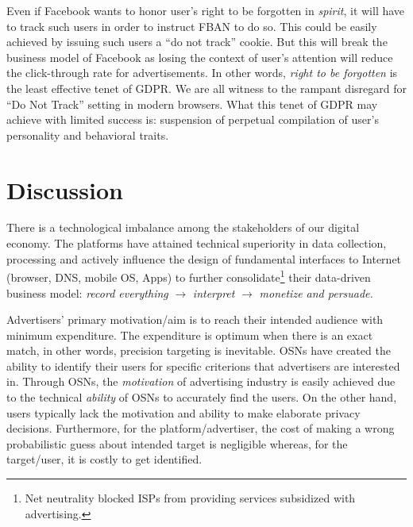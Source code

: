 \documentclass[runningheads]{llncs}
\begin{document}
Even if Facebook wants to honor user's right to be forgotten in
\textit{spirit}, it will have to track such users in order to instruct
FBAN to do so. This could be easily achieved by issuing such users a
``do not track'' cookie. But this will break the business model of
Facebook as losing the context of user's attention will reduce the
click-through rate for advertisements. In other words, \textit{right
  to be forgotten} is the least effective tenet of GDPR. We are all
witness to the rampant disregard for ``Do Not Track'' setting in
modern browsers. What this tenet of GDPR may achieve with limited
success is: suspension of perpetual compilation of user's personality
and behavioral traits.



\section{Discussion}
\label{sec:discussion}
\noindent There is a technological imbalance among the stakeholders of
our digital economy. The platforms have attained technical superiority
in data collection, processing and actively influence the design of
fundamental interfaces to Internet (browser, DNS, mobile OS, Apps) to
further consolidate\footnote{Net neutrality blocked ISPs from
  providing services subsidized with advertising.} their data-driven
business model: \textit{record everything} $\rightarrow$
\textit{interpret} $\rightarrow$ \textit{monetize and persuade.}

Advertisers' primary motivation/aim is to reach their intended
audience with minimum expenditure. The expenditure is optimum when
there is an exact match, in other words, precision targeting is
inevitable. OSNs have created the ability to identify their users for
specific criterions that advertisers are interested in. Through OSNs,
the \textit{motivation} of advertising industry is easily achieved due
to the technical \textit{ability} of OSNs to accurately find the
users. On the other hand, users typically lack the motivation and
ability to make elaborate privacy decisions. Furthermore, for the
platform/advertiser, the cost of making a wrong probabilistic guess
about intended target is negligible whereas, for the target/user, it
is costly to get identified.
\end{document}
